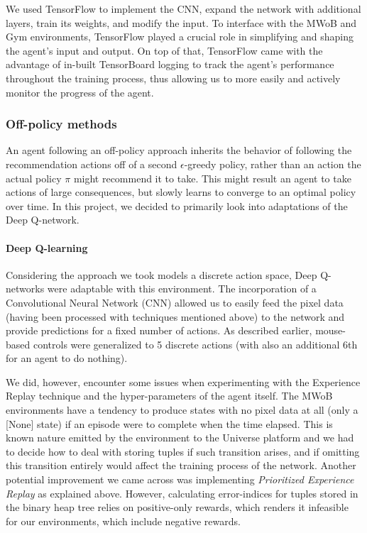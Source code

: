 \documentclass[10pt,journal,compsoc]{IEEEtran}
\begin{document}
We used TensorFlow to implement the CNN, expand the network with additional layers, train its weights, and modify the input. To interface with the MWoB and Gym environments, TensorFlow played a crucial role in simplifying and shaping the agent's input and output. On top of that, TensorFlow came with the advantage of in-built TensorBoard logging to track the agent's performance throughout the training process, thus allowing us to more easily and actively monitor the progress of the agent.

\subsubsection{Off-policy methods}  
An agent following an off-policy approach inherits the behavior of following the recommendation actions off of a second \(\epsilon\)-greedy policy, rather than an action the actual policy \(\pi\) might recommend it to take. This might result an agent to take actions of large consequences, but slowly learns to converge to an optimal policy over time. In this project, we decided to primarily look into adaptations of the Deep Q-network.\linebreak

\paragraph{\bf Deep Q-learning}
Considering the approach we took models a discrete action space, Deep Q-networks were adaptable with this environment. The incorporation of a Convolutional Neural Network (CNN) allowed us to easily feed the pixel data (having been processed with techniques mentioned above) to the network and provide predictions for a fixed number of actions. As described earlier, mouse-based controls were generalized to 5 discrete actions (with also an additional 6th for an agent to do nothing).\linebreak

We did, however, encounter some issues when experimenting with the Experience Replay technique and the hyper-parameters of the agent itself. The MWoB environments have a tendency to produce states with no pixel data at all (only a [None] state) if an episode were to complete when the time elapsed. This is known nature emitted by the environment to the Universe platform and we had to decide how to deal with storing tuples if such transition arises, and if omitting this transition entirely would affect the training process of the network. Another potential improvement we came across was implementing \textit{Prioritized Experience Replay} as explained above. However, calculating error-indices for tuples stored in the binary heap tree relies on positive-only rewards, which renders it infeasible for our environments, which include negative rewards.
\end{document}
